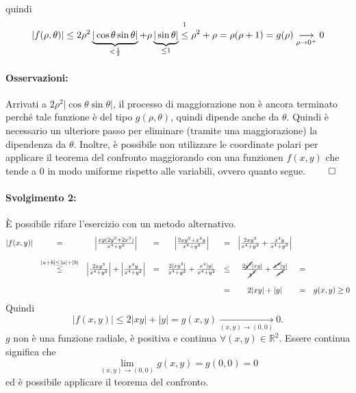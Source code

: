 \begin{example}
	\noindent quindi
	\begin{equation*}
		|f(\rho, \theta)|\leq 2\rho^2\underbrace{|\cos\theta\sin\theta|}_{<\frac{1}{2}} + \rho \underbrace{|\sin\theta|}_{\leq 1}\overset{\footnotemark}{\leq} \rho^2+\rho = \rho(\rho+1) = g(\rho)\underset{\rho\rightarrow0^+}{\longrightarrow}0
	\end{equation*}
	
	\paragraph{Osservazioni:} Arrivati a $2\rho^2|\cos\theta\sin\theta|$, il processo di maggiorazione non è ancora terminato perché tale funzione è del tipo $g(\rho,\theta)$, quindi dipende anche da $\theta$. Quindi è necessario un ulteriore passo per eliminare (tramite una maggiorazione) la dipendenza da $\theta$. Inoltre, è possibile non utilizzare le coordinate polari per applicare il teorema del confronto maggiorando con una funzionen $f(x,y)$ che tende a 0 in modo uniforme rispetto alle variabili, ovvero quanto segue. $\qed$
	
	\paragraph{Svolgimento 2:} È possibile rifare l'esercizio con un metodo alternativo.
	\begin{equation*}
		\begin{matrix}
			|f(x,y)| &=& \left| \frac{xy(2y^2 + 2 x^3)}{x^4+y^2}\right| &=& \left| \frac{2xy^3 + x^4y}{x^4+y^2}\right| &=& \left|\frac{2xy^3}{x^4+y^2} + \frac{x^4y}{x^4+y^2}\right|\\\\ &\overset{|a+b|\leq|a|+|b|}{\leq}& \left|\frac{2xy^3}{x^4+y^2}\right| + \left| \frac{x^4y}{x^4+y^2}\right| &=& \frac{2|xy^3|}{x^4+y^2} + \frac{x^4|y|}{x^4+y^2} &\leq& \frac{2\cancel{y^2}|xy|}{\cancel{y^2}} +  \frac{\cancel{x^4}|y|}{\cancel{x^4}} &=&\\\\
			&&&&&=& 2|xy|+|y| &=& g(x,y) \geq 0
		\end{matrix}
	\end{equation*}
	Quindi
	\begin{equation*}
		|f(x,y)| \leq  2|xy|+|y| = g(x,y)\underset{(x,y)\rightarrow(0,0)}{\longrightarrow} 0.
	\end{equation*}
	$g$ non è una funzione radiale, è positiva e continua $\forall(x,y)\in\mathbb{R}^2$. Essere continua significa che
	\begin{equation*}
		\lim_{(x,y)\rightarrow(0,0)} g(x,y)=g(0,0)=0
	\end{equation*}
	ed è possibile applicare il teorema del confronto.
\end{example}

